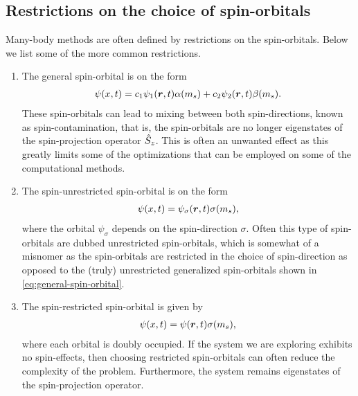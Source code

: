         \subsection{Restrictions on the choice of spin-orbitals}
            \label{subsec:restrictions-on-spin-orbitals}
            Many-body methods are often defined by restrictions on the
            spin-orbitals.
            Below we list some of the more common restrictions.
            \begin{enumerate}
                \item The general spin-orbital is on the form
                    \begin{align}
                        \psi(x, t)
                        = c_1\psi_1(\boldsymbol{r}, t) \alpha(m_s)
                        + c_2\psi_2(\boldsymbol{r}, t) \beta(m_s).
                        \label{eq:general-spin-orbital}
                    \end{align}
                    These spin-orbitals can lead to mixing between both
                    spin-directions, known as spin-contamination, that is, the
                    spin-orbitals are no longer eigenstates of the
                    spin-projection operator $\hat{S}_{z}$.
                    This is often an unwanted effect as this greatly limits some
                    of the optimizations that can be employed on some of the
                    computational methods.
                \item The spin-unrestricted spin-orbital is on the form
                    \begin{align}
                        \psi(x, t)
                        = \psi_{\sigma}(\boldsymbol{r}, t) \sigma(m_s),
                        \label{eq:unrestricted-spin-orbital}
                    \end{align}
                    where the orbital $\psi_{\sigma}$ depends on the
                    spin-direction $\sigma$.
                    Often this type of spin-orbitals are dubbed unrestricted
                    spin-orbitals, which is somewhat of a misnomer as the
                    spin-orbitals are restricted in the choice of spin-direction
                    as opposed to the (truly) unrestricted generalized
                    spin-orbitals shown in \autoref{eq:general-spin-orbital}.
                \item The spin-restricted spin-orbital is given by
                    \begin{align}
                        \psi(x, t)
                        = \psi(\boldsymbol{r}, t) \sigma(m_s),
                        \label{eq:restricted-spin-orbital}
                    \end{align}
                    where each orbital is doubly occupied.
                    If the system we are exploring exhibits no spin-effects,
                    then choosing restricted spin-orbitals can often reduce the
                    complexity of the problem.
                    Furthermore, the system remains eigenstates of the
                    spin-projection operator.
            \end{enumerate}

